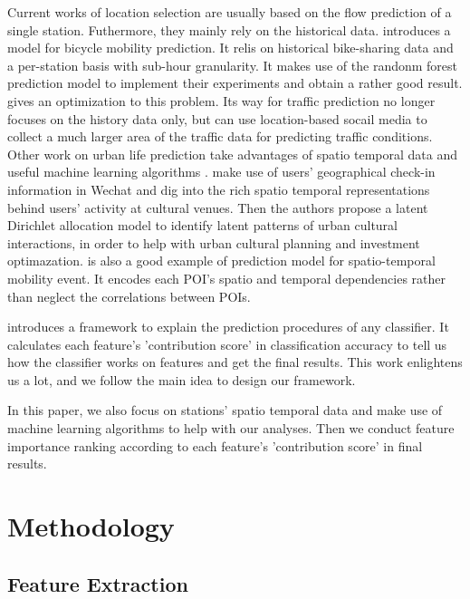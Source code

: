 \documentclass[runningheads]{llncs}
\begin{document}
Current works of location selection are usually based on the flow prediction of a single station. Futhermore, they mainly rely on the historical data. \cite{Yang:2016:MMP} introduces a model for bicycle mobility prediction. It relis on historical bike-sharing data and a per-station basis with sub-hour granularity. It makes use of the randonm forest prediction model to implement their experiments and obtain a rather good result. \cite{Liu:2016:CTP} gives an optimization to this problem. Its way for traffic prediction no longer focuses on the history data only, but can use location-based socail media to collect a much larger area of the traffic data for predicting traffic conditions. Other work on urban life prediction take advantages of spatio temporal data and useful machine learning algorithms \cite{Hoang:2016,Li:2018,Liao:2018:DSL:3219819.3219895,Liu:2016:CTP,Shen:2018:SNS,Zhou:2018:DLP:3219819.3219929}. \cite{Zhou:2018:DLP:3219819.3219929} make use of users' geographical check-in information in Wechat and dig into the rich spatio temporal representations behind users' activity at cultural venues. Then the authors propose a latent Dirichlet allocation model to identify latent patterns of urban cultural interactions, in order to help with urban cultural planning and investment optimazation. \cite{Shen:2018:SNS} is also a good example of prediction model for spatio-temporal mobility event. It encodes each POI's spatio and temporal dependencies rather than neglect the correlations between POIs.

\cite{lime} introduces a framework to explain the prediction procedures of any classifier. It calculates each feature's 'contribution score' in classification accuracy to tell us how the classifier works on features and get the final results. This work enlightens us a lot, and we follow the main idea to design our framework.

In this paper, we also focus on stations' spatio temporal data and make use of machine learning algorithms to help with our analyses. Then we conduct feature importance ranking according to each feature's 'contribution score' in final results.

\section{Methodology}
\subsection{Feature Extraction}
\end{document}
